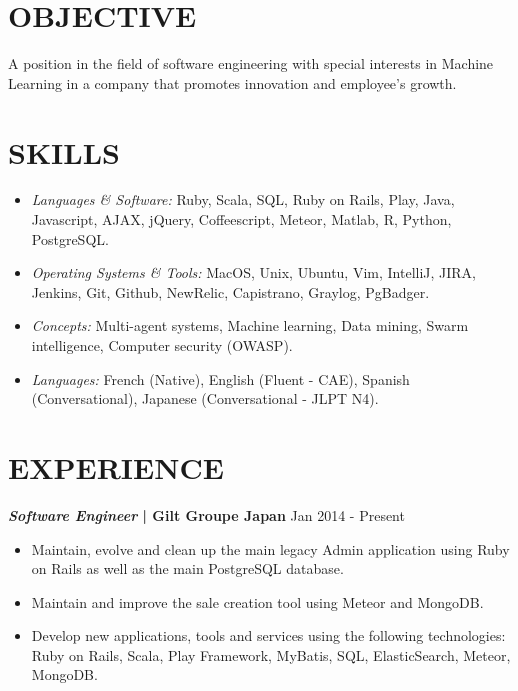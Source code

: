 \documentclass[line, margin]{res}
\begin{document}
\address{ 151-0051 Tokyo, Shibuya, Sendagaya 3-7-8 Urbanex Harajuku 605 }
\address{ abalonperin1@gmail.com | https://linkedin.com/in/abalonperin | https://github.com/zolrag13 }
 
\begin{resume}
 
\section{OBJECTIVE} A position in the field of software engineering with special interests in Machine Learning in a
company that promotes innovation and employee's growth. 
 
\section{SKILLS}
                 \begin{itemize} %
                  \item {\sl Languages \& Software:} Ruby, Scala, SQL, Ruby on Rails, Play, Java, Javascript, AJAX, jQuery, Coffeescript, Meteor, Matlab, R, Python, PostgreSQL.
                  \item {\sl Operating Systems \& Tools:} MacOS, Unix, Ubuntu, Vim, IntelliJ, JIRA, Jenkins, Git,
                    Github, NewRelic, Capistrano, Graylog, PgBadger.
                  \item {\sl Concepts:} Multi-agent systems, Machine learning, Data mining, Swarm intelligence, Computer security (OWASP).
                  \item {\sl Languages:} French (Native), English (Fluent - CAE), Spanish (Conversational), Japanese (Conversational - JLPT N4).
                \end{itemize}
 
\section{EXPERIENCE} \textbf{\textit{Software Engineer} | Gilt Groupe Japan} \hfill Jan 2014 - Present\\
                 \begin{itemize} %
                  \item  Maintain, evolve and clean up the main legacy Admin application using Ruby on Rails as well as the main PostgreSQL database.
                  \item  Maintain and improve the sale creation tool using Meteor and MongoDB.
                  \item  Develop new applications, tools and services using the following technologies: Ruby on Rails, Scala, Play Framework, MyBatis, SQL, ElasticSearch, Meteor, MongoDB.
                 \end{itemize}
 

\end{resume}
\end{document}
